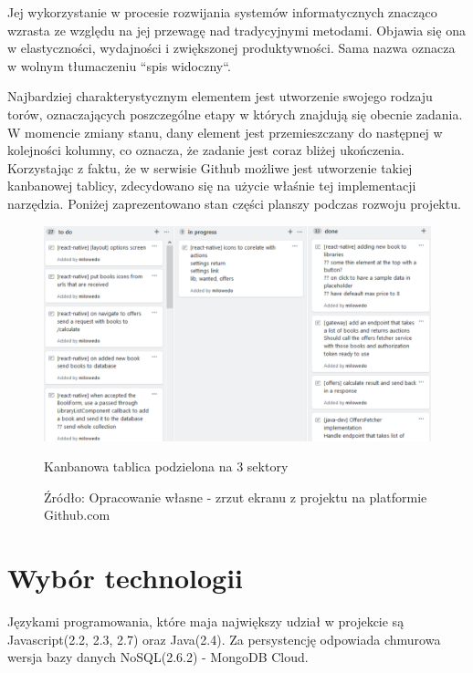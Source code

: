 \newpage
Jej wykorzystanie w procesie rozwijania systemów informatycznych znacząco wzrasta ze względu na jej przewagę nad tradycyjnymi metodami. Objawia się ona w elastyczności, wydajności i zwiększonej produktywności. Sama nazwa oznacza w wolnym tłumaczeniu ``spis widoczny``.~\cite{kanban}

Najbardziej charakterystycznym elementem jest utworzenie swojego rodzaju torów, oznaczających poszczególne etapy w których znajdują się obecnie zadania. W momencie zmiany stanu, dany element jest przemieszczany do następnej w kolejności kolumny, co oznacza, że zadanie jest coraz bliżej ukończenia.\newline
Korzystając z faktu, że w serwisie Github możliwe jest utworzenie takiej kanbanowej tablicy, zdecydowano się na użycie właśnie tej implementacji narzędzia. Poniżej zaprezentowano stan części planszy podczas rozwoju projektu.
\begin{figure}[H]
	\centering
	\includegraphics[width=\linewidth]{kanban.pdf}
	\caption{\centering Kanbanowa tablica podzielona na 3 sektory}
	\caption*{\centering Źródło: {Opracowanie własne - zrzut ekranu z projektu na platformie Github.com}}
\end{figure}

\newpage
\section{Wybór technologii}
Językami programowania, które maja największy udział w projekcie są Javascript(2.2, 2.3, 2.7) oraz Java(2.4).\newline
Za persystencję odpowiada chmurowa wersja bazy danych NoSQL(2.6.2) - MongoDB Cloud.

